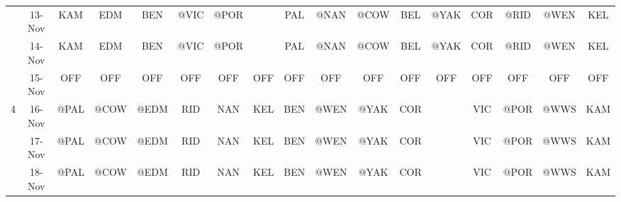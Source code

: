 \begin{table}[htbp]
\begin{tabular}{ccrrrrrrrrrrrrrrr}
          & 13-Nov & \multicolumn{1}{c}{KAM} & \multicolumn{1}{c}{EDM} & \multicolumn{1}{c}{BEN} & \multicolumn{1}{c}{@VIC} & \multicolumn{1}{c}{\cellcolor[rgb]{ .588,  .588,  .588}@POR} &       & \multicolumn{1}{c}{PAL} & \multicolumn{1}{c}{@NAN} & \multicolumn{1}{c}{\cellcolor[rgb]{ .588,  .588,  .588}@COW} & \multicolumn{1}{c}{BEL} & \multicolumn{1}{c}{\cellcolor[rgb]{ .588,  .588,  .588}@YAK} & \multicolumn{1}{c}{COR} & \multicolumn{1}{c}{\cellcolor[rgb]{ .588,  .588,  .588}@RID} & \multicolumn{1}{c}{@WEN} & \multicolumn{1}{c}{KEL} \\
          & 14-Nov & \multicolumn{1}{c}{KAM} & \multicolumn{1}{c}{EDM} & \multicolumn{1}{c}{BEN} & \multicolumn{1}{c}{@VIC} & \multicolumn{1}{c}{\cellcolor[rgb]{ .588,  .588,  .588}@POR} &       & \multicolumn{1}{c}{PAL} & \multicolumn{1}{c}{@NAN} & \multicolumn{1}{c}{\cellcolor[rgb]{ .588,  .588,  .588}@COW} & \multicolumn{1}{c}{BEL} & \multicolumn{1}{c}{\cellcolor[rgb]{ .588,  .588,  .588}@YAK} & \multicolumn{1}{c}{COR} & \multicolumn{1}{c}{\cellcolor[rgb]{ .588,  .588,  .588}@RID} & \multicolumn{1}{c}{@WEN} & \multicolumn{1}{c}{KEL} \\
          & 15-Nov & \multicolumn{1}{c}{OFF} & \multicolumn{1}{c}{OFF} & \multicolumn{1}{c}{OFF} & \multicolumn{1}{c}{OFF} & \multicolumn{1}{c}{OFF} & \multicolumn{1}{c}{OFF} & \multicolumn{1}{c}{OFF} & \multicolumn{1}{c}{OFF} & \multicolumn{1}{c}{OFF} & \multicolumn{1}{c}{OFF} & \multicolumn{1}{c}{OFF} & \multicolumn{1}{c}{OFF} & \multicolumn{1}{c}{OFF} & \multicolumn{1}{c}{OFF} & \multicolumn{1}{c}{OFF} \\
    4     & 16-Nov & \multicolumn{1}{c}{@PAL} & \multicolumn{1}{c}{@COW} & \multicolumn{1}{c}{@EDM} & \multicolumn{1}{c}{RID} & \multicolumn{1}{c}{NAN} & \multicolumn{1}{c}{KEL} & \multicolumn{1}{c}{BEN} & \multicolumn{1}{c}{@WEN} & \multicolumn{1}{c}{\cellcolor[rgb]{ .588,  .588,  .588}@YAK} & \multicolumn{1}{c}{COR} &       & \multicolumn{1}{c}{VIC} & \multicolumn{1}{c}{@POR} & \multicolumn{1}{c}{@WWS} & \multicolumn{1}{c}{KAM} \\
          & 17-Nov & \multicolumn{1}{c}{@PAL} & \multicolumn{1}{c}{@COW} & \multicolumn{1}{c}{@EDM} & \multicolumn{1}{c}{RID} & \multicolumn{1}{c}{NAN} & \multicolumn{1}{c}{KEL} & \multicolumn{1}{c}{BEN} & \multicolumn{1}{c}{@WEN} & \multicolumn{1}{c}{\cellcolor[rgb]{ .588,  .588,  .588}@YAK} & \multicolumn{1}{c}{COR} &       & \multicolumn{1}{c}{VIC} & \multicolumn{1}{c}{@POR} & \multicolumn{1}{c}{@WWS} & \multicolumn{1}{c}{KAM} \\
          & 18-Nov & \multicolumn{1}{c}{@PAL} & \multicolumn{1}{c}{@COW} & \multicolumn{1}{c}{@EDM} & \multicolumn{1}{c}{RID} & \multicolumn{1}{c}{NAN} & \multicolumn{1}{c}{KEL} & \multicolumn{1}{c}{BEN} & \multicolumn{1}{c}{@WEN} & \multicolumn{1}{c}{\cellcolor[rgb]{ .588,  .588,  .588}@YAK} & \multicolumn{1}{c}{COR} &       & \multicolumn{1}{c}{VIC} & \multicolumn{1}{c}{@POR} & \multicolumn{1}{c}{@WWS} & \multicolumn{1}{c}{KAM} \\

\end{tabular}
\end{table}
